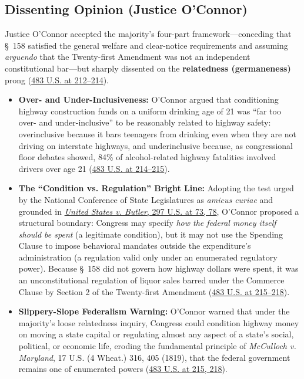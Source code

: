 \documentclass[12pt]{article}
\begin{document}
\subsection{Dissenting Opinion (Justice O'Connor)}

Justice O'Connor accepted the majority's four-part framework---conceding that \S~158 satisfied the general welfare and clear-notice requirements and assuming \textit{arguendo} that the Twenty-first Amendment was not an independent constitutional bar---but sharply dissented on the \textbf{relatedness (germaneness)} prong (\href{https://supreme.justia.com/cases/federal/us/483/203/}{483 U.S. at 212--214}).

\begin{itemize}
  \item \textbf{Over- and Under-Inclusiveness:} O'Connor argued that conditioning highway construction funds on a uniform drinking age of 21 was ``far too over- and under-inclusive'' to be reasonably related to highway safety: overinclusive because it bars teenagers from drinking even when they are not driving on interstate highways, and underinclusive because, as congressional floor debates showed, 84\% of alcohol-related highway fatalities involved drivers over age 21 (\href{https://supreme.justia.com/cases/federal/us/483/203/}{483 U.S. at 214--215}).
  \item \textbf{The ``Condition vs. Regulation'' Bright Line:} Adopting the test urged by the National Conference of State Legislatures as \textit{amicus curiae} and grounded in \href{https://supreme.justia.com/cases/federal/us/297/1/}{\textit{United States v. Butler}, 297 U.S. at 73, 78}, O'Connor proposed a structural boundary: Congress may specify \textit{how the federal money itself should be spent} (a legitimate condition), but it may not use the Spending Clause to impose behavioral mandates outside the expenditure's administration (a regulation valid only under an enumerated regulatory power). Because \S~158 did not govern how highway dollars were spent, it was an unconstitutional regulation of liquor sales barred under the Commerce Clause by Section 2 of the Twenty-first Amendment (\href{https://supreme.justia.com/cases/federal/us/483/203/}{483 U.S. at 215--218}).
  \item \textbf{Slippery-Slope Federalism Warning:} O'Connor warned that under the majority's loose relatedness inquiry, Congress could condition highway money on moving a state capital or regulating almost any aspect of a state's social, political, or economic life, eroding the fundamental principle of \textit{McCulloch v. Maryland}, 17 U.S. (4 Wheat.) 316, 405 (1819), that the federal government remains one of enumerated powers (\href{https://supreme.justia.com/cases/federal/us/483/203/}{483 U.S. at 215, 218}).
\end{itemize}
\end{document}
